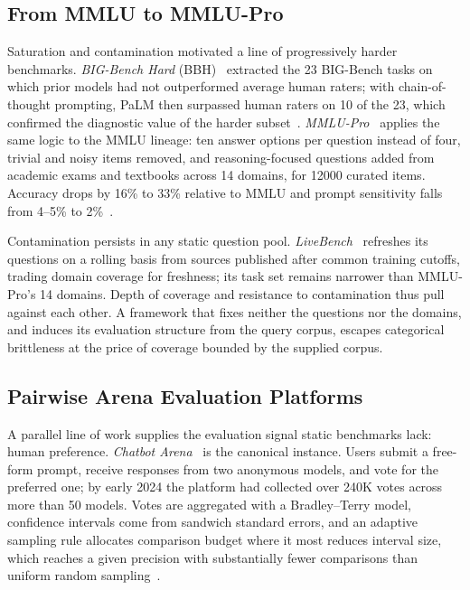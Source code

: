 \subsection*{From MMLU to MMLU-Pro}

Saturation and contamination motivated a line of progressively harder
benchmarks. \textit{BIG-Bench Hard}
(BBH)~\parencite{suzgun2022bigbench} extracted the 23 BIG-Bench tasks
on which prior models had not outperformed average human raters;
with chain-of-thought prompting, PaLM then surpassed human raters on
10 of the 23, which confirmed the diagnostic value of the harder
subset~\parencite{suzgun2022bigbench}.
\textit{MMLU-Pro}~\parencite{wang2024mmlupro} applies the same logic
to the MMLU lineage: ten answer options per question instead of four,
trivial and noisy items removed, and reasoning-focused questions
added from academic exams and textbooks across 14 domains, for
\num{12000} curated items. Accuracy drops by 16\% to 33\% relative to
MMLU and prompt sensitivity falls from 4--5\% to
2\%~\parencite{wang2024mmlupro}.

Contamination persists in any static question pool.
\textit{LiveBench}~\parencite{white2024livebench} refreshes its
questions on a rolling basis from sources published after common
training cutoffs, trading domain coverage for freshness; its task set
remains narrower than MMLU-Pro's 14 domains. Depth of coverage and
resistance to contamination thus pull against each other. A framework
that fixes neither the questions nor the domains, and induces its
evaluation structure from the query corpus, escapes categorical
brittleness at the price of coverage bounded by the supplied corpus.

\subsection*{Pairwise Arena Evaluation Platforms}

A parallel line of work supplies the evaluation signal static
benchmarks lack: human preference. \textit{Chatbot
Arena}~\parencite{chiang2024chatbotarena} is the canonical instance.
Users submit a free-form prompt, receive responses from two anonymous
models, and vote for the preferred one; by early 2024 the platform
had collected over 240K votes across more than 50 models. Votes are
aggregated with a Bradley--Terry model, confidence intervals come
from sandwich standard errors, and an adaptive sampling rule
allocates comparison budget where it most reduces interval size,
which reaches a given precision with substantially fewer comparisons
than uniform random sampling~\parencite{chiang2024chatbotarena}.

